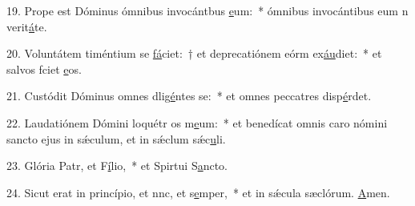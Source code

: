 19. Prope est Dóminus ómnibus invocántbus \uline{e}um:~* ómnibus invocántibus eum n verit\uline{á}te.\par 
20. Voluntátem timéntium se \uline{fá}ciet:~† et deprecatiónem eórm ex\uline{áu}diet:~* et salvos fciet \uline{e}os.\par 
21. Custódit Dóminus omnes dlig\uline{é}ntes se:~* et omnes peccatres disp\uline{é}rdet.\par 
22. Laudatiónem Dómini loquétr os m\uline{e}um:~* et benedícat omnis caro nómini sancto ejus in sǽculum, et in sǽclum sǽc\uline{u}li.\par 
23. Glória Patr, et F\uline{í}lio,~* et Spirtui S\uline{a}ncto.\par 
24. Sicut erat in princípio, et nnc, et s\uline{e}mper,~* et in sǽcula sæclórum. \uline{A}men.\par 
